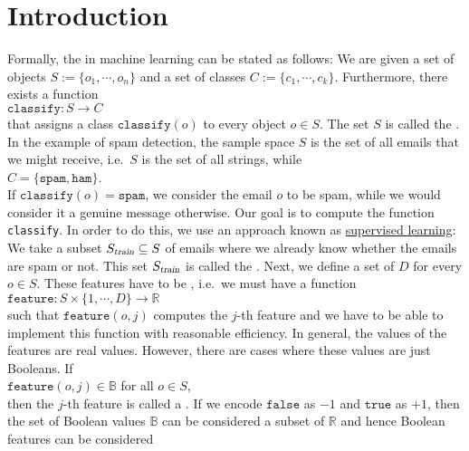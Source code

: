 \section{Introduction}
Formally, the  in machine learning can be stated as follows:  We are given a
set of objects $S := \{ o_1, \cdots, o_n \}$ and a set of classes $C := \{ c_1, \cdots, c_k \}$.  Furthermore, there exists a function 
\\[0.2cm]
\hspace*{1.3cm}
$\mathtt{classify}: S \rightarrow C$
\\[0.2cm]
that assigns a class $\texttt{classify}(o)$ to every object $o \in S$.  The set $S$ is called the .
In the example of spam detection, the sample space $S$ is the set of all emails that we might receive, i.e.~$S$
is the set of all strings, while  
\\[0.2cm]
\hspace*{1.3cm}
$C = \{ \mathtt{spam}, \mathtt{ham} \}$.
\\[0.2cm]
If $\mathtt{classify}(o) = \mathtt{spam}$, we consider the email $o$ to be spam, while we would consider it a
genuine message otherwise.  Our goal is to compute the function
\texttt{classify}.  In order to do this, we use an approach known as
\href{https://en.wikipedia.org/wiki/Supervised_learning}{supervised learning}:  We take a subset $S_\textsl{train} \subseteq S$ of
emails where we already know whether the emails are spam or not.  This set $S_\textsl{train}$ is called the .
Next, we define a set of $D$  for every $o \in S$.  These features have to be ,
i.e.~we must have a function
\\[0.2cm]
\hspace*{1.3cm}
$\mathtt{feature}: S \times \{ 1, \cdots, D \} \rightarrow \mathbb{R}$ 
\\[0.2cm]
such that $\mathtt{feature}(o, j)$ computes the $j$-th feature and we have to be able to implement
this function with reasonable efficiency.  In general, the values of the features are real values.
However, there are cases where these values are just 
Booleans.  If
\\[0.2cm]
\hspace*{1.3cm}
$\texttt{feature}(o, j) \in \mathbb{B}$ \quad for all $o \in S$,
\\[0.2cm]
then the $j$-th feature is called a .  If we encode $\mathtt{false}$ as $-1$ and $\mathtt{true}$ as
$+1$, then the set of Boolean values $\mathbb{B}$ can be considered a subset of $\mathbb{R}$ and hence Boolean features can be considered
